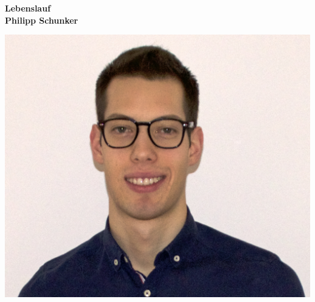 %
%
% 
% 
% 

\thispagestyle{empty}

\begin{minipage}{0.7\textwidth}
\begin{addmargin}[2em]{2em}%
\Large{\textbf{Lebenslauf}}\vspace{0.1cm}\\
\Large{\textbf{Philipp Schunker}}\vspace{1.0cm}\\
\end{addmargin}
\end{minipage}
\begin{minipage}{0.3\textwidth}
	 \includegraphics[width=\textwidth]{images/philipp}
\end{minipage}

